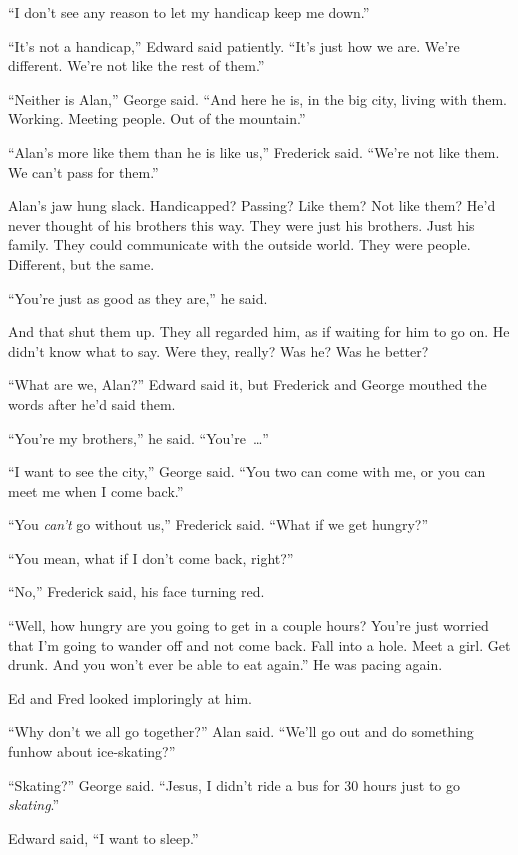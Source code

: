 ``I don't see any reason to let my handicap keep me down.''

``It's not a handicap,'' Edward said patiently.  ``It's just how we
are.  We're different.  We're not like the rest of them.''

``Neither is Alan,'' George said.  ``And here he is, in the big city,
living with them.  Working.  Meeting people.  Out of the mountain.''

``Alan's more like them than he is like us,'' Frederick said.  ``We're
not like them.  We can't pass for them.''

Alan's jaw hung slack.  Handicapped?  Passing?  Like them?  Not like
them?  He'd never thought of his brothers this way.  They were just
his brothers.  Just his family.  They could communicate with the
outside world.  They were people.  Different, but the same.

``You're just as good as they are,'' he said.

And that shut them up.  They all regarded him, as if waiting for him
to go on.  He didn't know what to say.  Were they, really?  Was he? 
Was he better?

``What are we, Alan?'' Edward said it, but Frederick and George
mouthed the words after he'd said them.

``You're my brothers,'' he said.  ``You're~\ldots{}''

``I want to see the city,'' George said.  ``You two can come with me,
or you can meet me when I come back.''

``You \textit{can't} go without us,'' Frederick said.  ``What if we
get hungry?''

``You mean, what if I don't come back, right?''

``No,'' Frederick said, his face turning red.

``Well, how hungry are you going to get in a couple hours?  You're
just worried that I'm going to wander off and not come back.  Fall
into a hole.  Meet a girl.  Get drunk.  And you won't ever be able to
eat again.'' He was pacing again.

Ed and Fred looked imploringly at him.

``Why don't we all go together?'' Alan said.  ``We'll go out and do
something fun\dash{}how about ice-skating?''

``Skating?'' George said.  ``Jesus, I didn't ride a bus for 30 hours
just to go \textit{skating}.''

Edward said, ``I want to sleep.''

